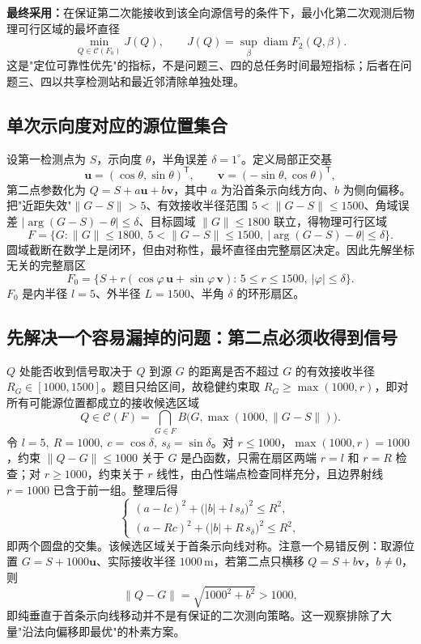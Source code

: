 \documentclass[12pt,a4paper]{ctexart}
\newcommand{\diam}{\operatorname{diam}}
\begin{document}
\noindent\textbf{最终采用：}在保证第二次能接收到该全向源信号的条件下，最小化第二次观测后物理可行区域的最坏直径
\[
 \min_{Q\in\mathcal C(F_0)} J(Q),\qquad
 J(Q)=\sup_{\beta}\diam F_2(Q,\beta).
\]
这是"定位可靠性优先"的指标，不是问题三、四的总任务时间最短指标；后者在问题三、四以共享检测站和最近邻清除单独处理。

\subsection{单次示向度对应的源位置集合}
\label{sec:q2-F0}
设第一检测点为 $S$，示向度 $\theta$，半角误差 $\delta=1^\circ$。定义局部正交基
\begin{equation}
 \bm u=(\cos\theta,\sin\theta)^{\mathsf T},\qquad
 \bm v=(-\sin\theta,\cos\theta)^{\mathsf T},
\end{equation}
第二点参数化为 $Q=S+a\bm u+b\bm v$，其中 $a$ 为沿首条示向线方向、$b$ 为侧向偏移。把"近距失效"$\|G-S\|>5$、有效接收半径范围 $5<\|G-S\|\le1500$、角域误差 $|\arg(G-S)-\theta|\le\delta$、目标圆域 $\|G\|\le1800$ 联立，得物理可行区域
\begin{equation}
 F=\bigl\{G:\|G\|\le1800,\ 5<\|G-S\|\le1500,\ |\arg(G-S)-\theta|\le\delta\bigr\}.
\end{equation}
圆域截断在数学上是闭环，但由对称性，最坏直径由完整扇区决定。因此先解坐标无关的完整扇区
\begin{equation}
 F_0=\bigl\{S+r(\cos\varphi\,\bm u+\sin\varphi\,\bm v):\,5\le r\le1500,\ |\varphi|\le\delta\bigr\}.
 \label{eq:F0}
\end{equation}
$F_0$ 是内半径 $l=5$、外半径 $L=1500$、半角 $\delta$ 的环形扇区。

\subsection{先解决一个容易漏掉的问题：第二点必须收得到信号}
\label{sec:q2-reception}
$Q$ 处能否收到信号取决于 $Q$ 到源 $G$ 的距离是否不超过 $G$ 的有效接收半径 $R_G\in[1000,1500]$。题目只给区间，故稳健约束取 $R_G\ge\max(1000,r)$，即对所有可能源位置都成立的接收候选区域
\begin{equation}
 Q\in\mathcal C(F)=\bigcap_{G\in F} B\bigl(G,\max(1000,\|G-S\|)\bigr).
 \label{eq:C-F}
\end{equation}
令 $l=5,\ R=1000,\ c=\cos\delta,\ s_\delta=\sin\delta$。对 $r\le1000$，$\max(1000,r)=1000$，约束 $\|Q-G\|\le1000$ 关于 $G$ 是凸函数，只需在扇区两端 $r=l$ 和 $r=R$ 检查；对 $r\ge1000$，约束关于 $r$ 线性，由凸性端点检查同样充分，且边界射线 $r=1000$ 已含于前一组。整理后得
\begin{equation}
 \boxed{\;
 \begin{cases}
 (a-lc)^2+\bigl(|b|+l\,s_\delta\bigr)^2\le R^2,\\[2pt]
 (a-Rc)^2+\bigl(|b|+R\,s_\delta\bigr)^2\le R^2,
 \end{cases}\;}
 \label{eq:reception-system}
\end{equation}
即两个圆盘的交集。该候选区域关于首条示向线对称。注意一个易错反例：取源位置 $G=S+1000\bm u$、实际接收半径 $1000\,\mathrm{m}$，若第二点只横移 $Q=S+b\bm v$，$b\ne0$，则
\[
 \|Q-G\|=\sqrt{1000^2+b^2}>1000,
\]
即纯垂直于首条示向线移动并不是有保证的二次测向策略。这一观察排除了大量"沿法向偏移即最优"的朴素方案。
\end{document}
